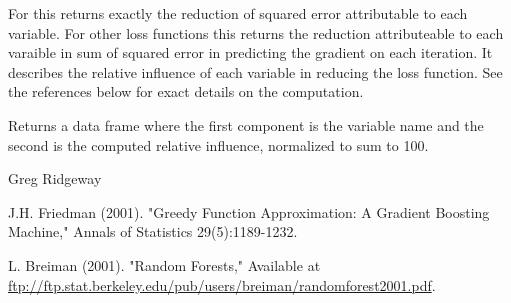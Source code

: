 \documentclass{article}
\begin{document}
\begin{Details}\relax
For  this returns exactly the reduction 
of squared error attributable to each variable. For other loss functions this 
returns the reduction attributeable to each varaible in sum of squared error in 
predicting the gradient on each iteration. It describes the relative influence 
of each variable in reducing the loss function. See the references below for 
exact details on the computation.
\end{Details}
\begin{Value}
Returns a data frame where the first component is the variable name and the
second is the computed relative influence, normalized to sum to 100.
\end{Value}
\begin{Author}\relax
Greg Ridgeway 
\end{Author}
\begin{References}\relax
J.H. Friedman (2001). "Greedy Function Approximation: A Gradient Boosting
Machine," Annals of Statistics 29(5):1189-1232.

L. Breiman (2001). "Random Forests," Available at \url{ftp://ftp.stat.berkeley.edu/pub/users/breiman/randomforest2001.pdf}.
\end{References}
\begin{SeeAlso}\relax
{}
\end{SeeAlso}
\end{document}
